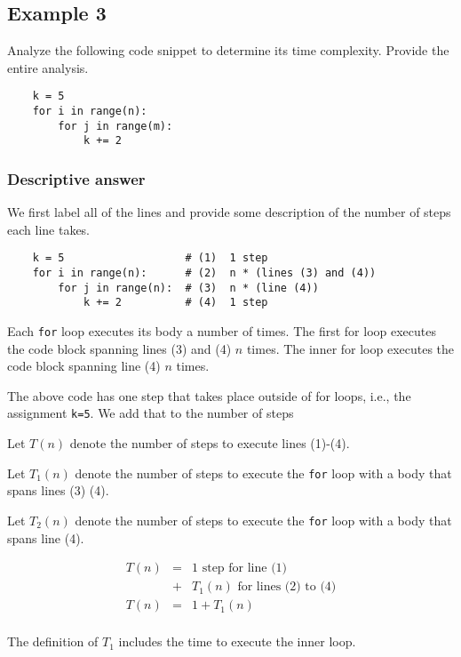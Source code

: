 \documentclass{article}
\begin{document}
\newpage

\subsection{Example 3}

Analyze the following code snippet to determine its time complexity.
Provide the entire analysis.

\begin{verbatim}
    k = 5
    for i in range(n):
        for j in range(m):
            k += 2
\end{verbatim}

\subsubsection{Descriptive answer}

We first label all of the lines and provide some description of the
number of steps each line takes.

\begin{verbatim}
    k = 5                   # (1)  1 step     
    for i in range(n):      # (2)  n * (lines (3) and (4))
        for j in range(n):  # (3)  n * (line (4))
            k += 2          # (4)  1 step
\end{verbatim}

Each \verb|for| loop executes its body a number of times.  The first for loop
executes the code block spanning lines (3) and (4) $n$ times.   The inner
for loop executes the code block spanning line (4) $n$ times.

The above code has one step that takes place outside of for loops, i.e.,
the assignment \verb|k=5|.  We add that to the number of steps 

Let $T(n)$ denote the number of steps to execute lines (1)-(4).

Let $T_1(n)$ denote the number of steps to execute the \verb|for| loop with a body
that spans lines (3) (4).

Let $T_2(n)$ denote the number of steps to execute the \verb|for| loop with a body
that spans line (4).

\begin{eqnarray*}
  T(n) &=& 1 \text{ step for line (1) } \\
  &+& T_1(n) \text { for lines (2) to (4)} \\
  T(n) &=& 1 + T_1(n) \\
\end{eqnarray*}

The definition of $T_1$ includes the time to execute the inner loop.
\end{document}
